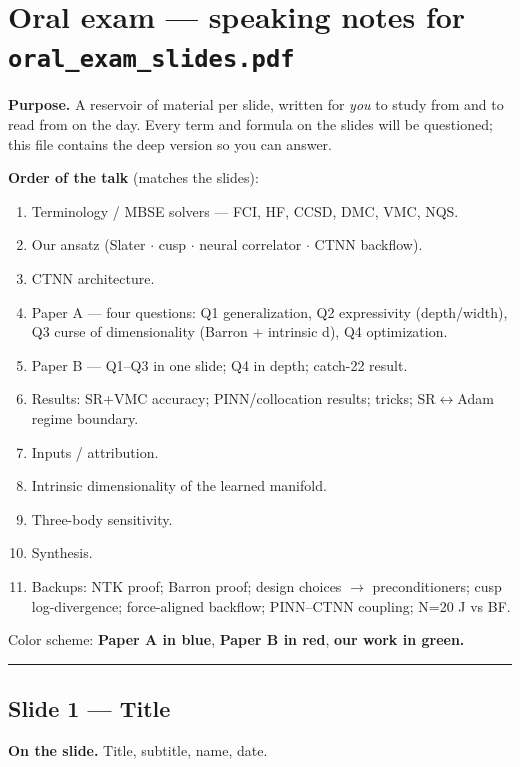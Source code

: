 \documentclass[11pt]{article}
\begin{document}
\section*{Oral exam --- speaking notes for \texttt{oral\_exam\_slides.pdf}}

\textbf{Purpose.} A reservoir of material per slide, written for \emph{you} to study from
and to read from on the day. Every term and formula on the slides will be
questioned; this file contains the deep version so you can answer.

\textbf{Order of the talk} (matches the slides):

\begin{enumerate}
\item Terminology / MBSE solvers --- FCI, HF, CCSD, DMC, VMC, NQS.
\item Our ansatz (Slater $\cdot$ cusp $\cdot$ neural correlator $\cdot$ CTNN backflow).
\item CTNN architecture.
\item Paper A --- four questions: Q1 generalization, Q2 expressivity (depth/width),
Q3 curse of dimensionality (Barron + intrinsic d), Q4 optimization.
\item Paper B --- Q1--Q3 in one slide; Q4 in depth; catch-22 result.
\item Results: SR+VMC accuracy; PINN/collocation results; tricks; SR$\leftrightarrow$Adam regime
boundary.
\item Inputs / attribution.
\item Intrinsic dimensionality of the learned manifold.
\item Three-body sensitivity.
\item Synthesis.
\item Backups: NTK proof; Barron proof; design choices $\to$ preconditioners; cusp
log-divergence; force-aligned backflow; PINN--CTNN coupling; N=20 J vs BF.
\end{enumerate}
Color scheme: \textbf{Paper A in blue}, \textbf{Paper B in red}, \textbf{our work in green.}

\vspace{4pt}\hrule\vspace{8pt}

\subsection*{Slide 1 --- Title}

\textbf{On the slide.} Title, subtitle, name, date.
\end{document}
